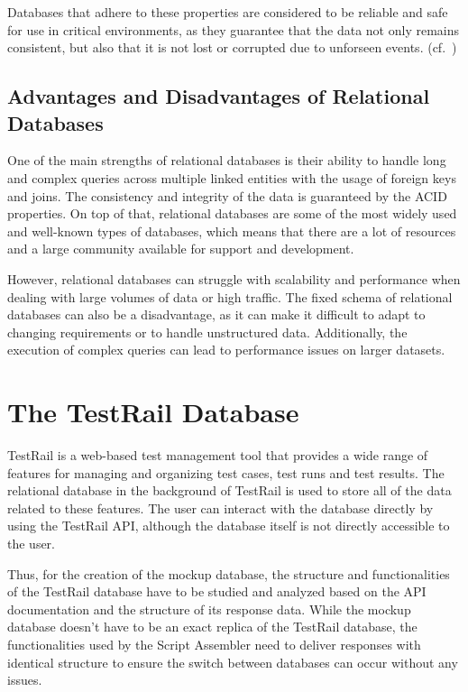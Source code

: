 Databases that adhere to these properties are considered to be reliable and safe for use in critical environments, as they guarantee that the data not only remains consistent, but also that it is not lost or corrupted due to unforseen events. (cf.~\cite{WikipediaACID})

\subsection{Advantages and Disadvantages of Relational Databases}

One of the main strengths of relational databases is their ability to handle long and complex queries across multiple linked entities with the usage of foreign keys and joins. The consistency and integrity of the data is guaranteed by the ACID properties. On top of that, relational databases are some of the most widely used and well-known types of databases, which means that there are a lot of resources and a large community available for support and development. 

However, relational databases can struggle with scalability and performance when dealing with large volumes of data or high traffic. The fixed schema of relational databases can also be a disadvantage, as it can make it difficult to adapt to changing requirements or to handle unstructured data. Additionally, the execution of complex queries can lead to performance issues on larger datasets.

\section{The TestRail Database}

TestRail is a web-based test management tool that provides a wide range of features for managing and organizing test cases, test runs and test results. The relational database in the background of TestRail is used to store all of the data related to these features. The user can interact with the database directly by using the TestRail API, although the database itself is not directly accessible to the user. 

Thus, for the creation of the mockup database, the structure and functionalities of the TestRail database have to be studied and analyzed based on the API documentation and the structure of its response data. While the mockup database doesn't have to be an exact replica of the TestRail database, the functionalities used by the Script Assembler need to deliver responses with identical structure to ensure the switch between databases can occur without any issues.

